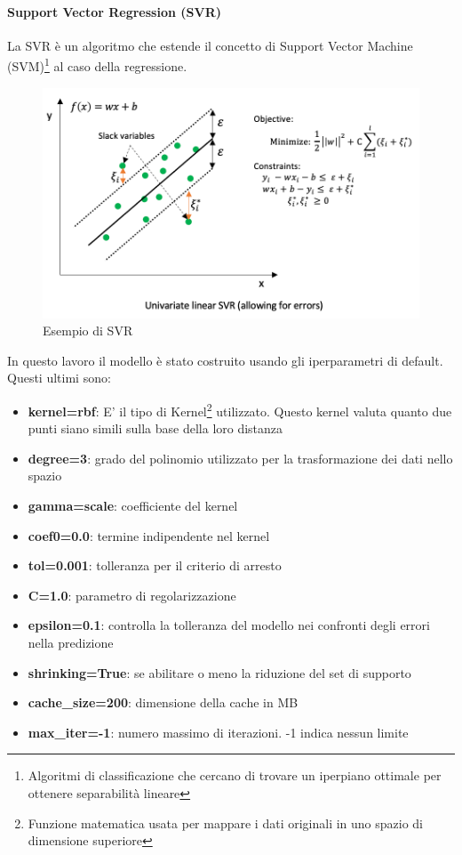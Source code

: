 \paragraph{Support Vector Regression (SVR)}
La SVR è un algoritmo che estende il concetto di Support Vector Machine (SVM)\footnote{Algoritmi di classificazione che cercano di trovare un iperpiano ottimale per ottenere separabilità lineare}{} al caso della regressione.
\begin{figure}[H]
    \centering
    \includegraphics[scale=0.5]{images/SVR.png}
    \caption*{Esempio di SVR}
\end{figure} \newpage
\noindent In questo lavoro il modello è stato costruito usando gli iperparametri di default. Questi ultimi sono:
\begin{itemize}
    \item \textbf{kernel=rbf}: E' il tipo di Kernel\footnote{Funzione matematica usata per mappare i dati originali in uno spazio di dimensione superiore}{} utilizzato. Questo kernel valuta quanto due punti siano simili sulla base della loro distanza
    \item \textbf{degree=3}:  grado del polinomio utilizzato per la trasformazione dei dati nello spazio
    \item \textbf{gamma=scale}: coefficiente del kernel
    \item \textbf{coef0=0.0}: termine indipendente nel kernel
    \item \textbf{tol=0.001}: tolleranza per il criterio di arresto
    \item \textbf{C=1.0}: parametro di regolarizzazione
    \item \textbf{epsilon=0.1}:  controlla la tolleranza del modello nei confronti degli errori nella predizione
    \item \textbf{shrinking=True}: se abilitare o meno la riduzione del set di supporto
    \item \textbf{cache\_size=200}: dimensione della cache in MB
    \item \textbf{max\_iter=-1}: numero massimo di iterazioni. -1 indica nessun limite
\end{itemize}


